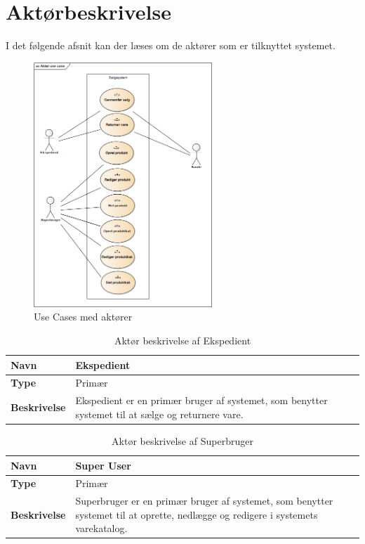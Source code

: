 \section{Aktørbeskrivelse}

I det følgende afsnit kan der læses om de aktører som er tilknyttet systemet. \\

\begin{figure}[H]
	\centering
	\includegraphics[width=0.6\textwidth]{Krav/Images/AktorUC}
	\caption{Use Cases med aktører}
	\label{fig:ActorUC}
\end{figure}

\begin{table}[H]
	\label{EKS}
	\begin{tabularx}{\textwidth}{|l|X|}
		\hline
		\textbf{Navn} & Ekspedient \\
		\hline
		\textbf{Type} & Primær \\
		\hline
		\textbf{Beskrivelse} & Ekspedient er en primær bruger af systemet, som benytter systemet til at sælge og returnere vare. \\
		\hline
	\end{tabularx}
	\captionsetup{justification=raggedright,singlelinecheck=false}
	\caption{Aktør beskrivelse af Ekspedient}
	\label{tab:AktEks}
\end{table}


\begin{table}[H]
	\begin{tabularx}{\textwidth}{|l|X|}
		\hline
		\textbf{Navn} & Super User \\
		\hline
		\textbf{Type} & Primær \\
		\hline
		\textbf{Beskrivelse} & Superbruger er en primær bruger af systemet, som benytter systemet til at oprette, nedlægge og redigere i systemets varekatalog. \\
		\hline
	\end{tabularx}
	\captionsetup{justification=raggedright,singlelinecheck=false}
	\caption{Aktør beskrivelse af Superbruger}
	\label{tab:AktSuu}
\end{table}

